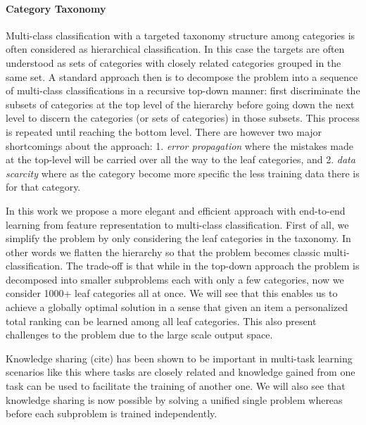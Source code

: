 \paragraph{Category Taxonomy}
Multi-class classification with a targeted taxonomy structure among categories is often considered as hierarchical classification. In this case the targets are often understood as sets of categories with closely related categories grouped in the same set. A standard approach then is to decompose the problem into a sequence of multi-class classifications in a recursive top-down manner: 
first discriminate the subsets of categories at the top level of the hierarchy before going down the next level to discern the categories (or sets of categories) in those subsets. This process is repeated until reaching the bottom level.  
There are however two major shortcomings about the approach: 1. \emph{error propagation} where the mistakes made at the top-level will be carried over all the way to the leaf categories, and 2. \emph{data scarcity} where as the category become more specific the less training data there is for that category. 

In this work we propose a more elegant and efficient approach with end-to-end learning from feature representation to multi-class classification. First of all, we simplify the problem by only considering the leaf categories in the taxonomy. In other words we flatten the hierarchy so that the problem becomes classic multi-classification. 
The trade-off is that while in the top-down approach the problem is decomposed into smaller subproblems each with only a few categories, now we consider 1000+ leaf categories all at once. We will see that this enables us to achieve a globally optimal solution in a sense that given an item a personalized total ranking can be learned among all leaf categories. This also present challenges to the problem due to the large scale output space. 

Knowledge sharing (cite) has been shown to be important in multi-task learning scenarios like this where tasks are closely related and knowledge gained from one task can be used to facilitate the training of another one. 
We will also see that knowledge sharing is now possible by solving a unified single problem whereas before each subproblem is trained independently. 


